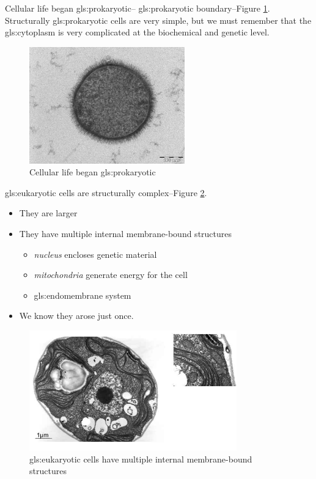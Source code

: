 \documentclass[]{article}
\begin{document}
Cellular life began \gls{gls:prokaryotic}-- \glsdesc{gls:prokaryotic}
boundary--Figure \ref{fig:prokaryote}. Structurally \gls{gls:prokaryotic} cells are very simple, but we must remember that the \gls{gls:cytoplasm} is very complicated at the biochemical and genetic level.

\begin{figure}[H]
	\begin{center}
		\caption{Cellular life began \gls{gls:prokaryotic}}\label{fig:prokaryote}
		\includegraphics[width=0.6\textwidth]{prokaryote}
	\end{center}
\end{figure}

\Gls{gls:eukaryotic} cells are structurally complex--Figure \ref{fig:ManyMembranes}. 

\begin{itemize}
	\item They are larger
	\item They have multiple internal membrane-bound structures
	\begin{itemize}
		\item \emph{nucleus} encloses genetic material
		\item \emph{mitochondria} generate energy for the cell
		\item \gls{gls:endomembrane} system
	\end{itemize}
	\item We know they arose just once.
\end{itemize}

\begin{figure}[H]
	\caption[\Gls{gls:eukaryotic} cells: multiple internal membrane-bound structures]{\Gls{gls:eukaryotic} cells have multiple internal membrane-bound structures}\label{fig:ManyMembranes}
	\includegraphics[width=0.8\textwidth]{ManyMembranes}
\end{figure}
\end{document}
